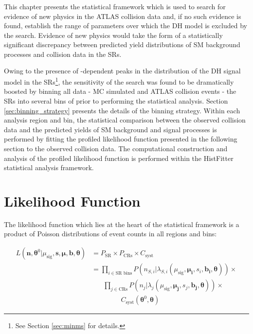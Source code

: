 \label{chapter:stat}

This chapter presents the statistical framework which is used to search for evidence of new physics in the ATLAS collision data and, if no such evidence is found, establish the range of parameters over which the DH model is excluded by the search. Evidence of new physics would take the form of a statistically significant discrepancy between predicted yield distributions of SM background processes and collision data in the SRs. 

Owing to the presence of \ms-dependent peaks in the \minms distribution of the DH signal model in the SRs\footnote{See Section \ref{sec:minms} for details.}, the sensitivity of the search was found to be dramatically boosted by binning all data - MC simulated and ATLAS collision events - the SRs into several bins of \minms prior to performing the statistical analysis. Section \ref{sec:binning_strategy} presents the details of the binning strategy. Within each analysis region and bin, the statistical comparison between the observed collision data and the predicted yields of SM background and signal processes is performed by fitting the  profiled likelihood function presented in the following section to the observed collision data. The computational construction and analysis of the profiled likelihood function is performed within the HistFitter \cite{Baak_2015} statistical analysis framework.

\section{Likelihood Function}
\label{sec:likelihood}

The likelihood function which lies at the heart of the statistical framework is a product of Poisson distributions of event counts in all regions and bins:

\begin{equation}
\label{eq:likelihood_func}
\begin{aligned}
L(\boldsymbol{n}, \boldsymbol{\theta}^0|\mu_\text{sig}, \boldsymbol{s}, \boldsymbol{\mu}, \boldsymbol{b}, \boldsymbol{\theta}) & = P_\text{SR} \times P_\text{CRs} \times C_\text{syst} \\
& = \prod_{i\in\text{SR bins}} P(n_{S,i}|\lambda_{S,i}(\mu_\text{sig}, \boldsymbol{\mu_i}, s_i, \boldsymbol{b_i}, \boldsymbol{\theta})) \times \\ 
&\phantom{xxx}\prod_{j \in \text{CRs}} P(n_j|\lambda_j(\mu_\text{sig}, \boldsymbol{\mu_j}, s_j, \boldsymbol{b_j}, \boldsymbol{\theta})) \times \\
&\phantom{xxxxxlxx}C_\text{syst}(\boldsymbol{\theta}^0, \boldsymbol{\theta})
\end{aligned}
\end{equation}

